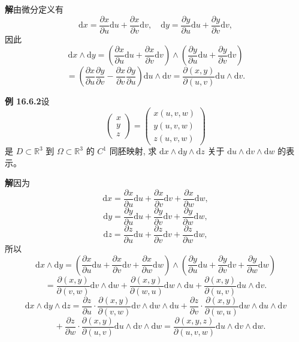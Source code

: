 \documentclass[UTF8,12pt,a4paper,fontset=fandol]{ctexart}
\begin{document}
\noindent\textbf{解}\quad 由微分定义有
\[
  \mathrm dx=\frac{\partial x}{\partial u}\mathrm du+\frac{\partial x}{\partial v}\mathrm dv,
  \quad
  \mathrm dy=\frac{\partial y}{\partial u}\mathrm du+\frac{\partial y}{\partial v}\mathrm dv,
\]
因此
\[
  \mathrm dx\wedge\mathrm dy
  =\left(\frac{\partial x}{\partial u}\mathrm du+\frac{\partial x}{\partial v}\mathrm dv\right)
  \wedge
  \left(\frac{\partial y}{\partial u}\mathrm du+\frac{\partial y}{\partial v}\mathrm dv\right)
\]
\[
  =\left(\frac{\partial x}{\partial u}\frac{\partial y}{\partial v}
  -\frac{\partial x}{\partial v}\frac{\partial y}{\partial u}\right)\mathrm du\wedge\mathrm dv
  =\frac{\partial(x,y)}{\partial(u,v)}\mathrm du\wedge\mathrm dv.
\]

\noindent\textbf{例 16.6.2}\quad 设
\[
  \begin{pmatrix}x\\y\\z\end{pmatrix}
  =
  \begin{pmatrix}x(u,v,w)\\y(u,v,w)\\z(u,v,w)\end{pmatrix}
\]
是 $D\subset\mathbb R^3$ 到 $\Omega\subset\mathbb R^3$ 的 $C^1$ 同胚映射, 求 $\mathrm dx\wedge\mathrm dy\wedge\mathrm dz$ 关于 $\mathrm du\wedge\mathrm dv\wedge\mathrm dw$ 的表示。

\noindent\textbf{解}\quad 因为
\[
  \mathrm dx=\frac{\partial x}{\partial u}\mathrm du+\frac{\partial x}{\partial v}\mathrm dv+\frac{\partial x}{\partial w}\mathrm dw,
\]
\[
  \mathrm dy=\frac{\partial y}{\partial u}\mathrm du+\frac{\partial y}{\partial v}\mathrm dv+\frac{\partial y}{\partial w}\mathrm dw,
\]
\[
  \mathrm dz=\frac{\partial z}{\partial u}\mathrm du+\frac{\partial z}{\partial v}\mathrm dv+\frac{\partial z}{\partial w}\mathrm dw,
\]
所以
\[
  \mathrm dx\wedge\mathrm dy
  =\left(\frac{\partial x}{\partial u}\mathrm du+\frac{\partial x}{\partial v}\mathrm dv+\frac{\partial x}{\partial w}\mathrm dw\right)
  \wedge
  \left(\frac{\partial y}{\partial u}\mathrm du+\frac{\partial y}{\partial v}\mathrm dv+\frac{\partial y}{\partial w}\mathrm dw\right)
\]
\[
  =\frac{\partial(x,y)}{\partial(v,w)}\mathrm dv\wedge\mathrm dw
  +\frac{\partial(x,y)}{\partial(w,u)}\mathrm dw\wedge\mathrm du
  +\frac{\partial(x,y)}{\partial(u,v)}\mathrm du\wedge\mathrm dv.
\]
\[
  \mathrm dx\wedge\mathrm dy\wedge\mathrm dz
  =\frac{\partial z}{\partial u}\cdot\frac{\partial(x,y)}{\partial(v,w)}
  \mathrm dv\wedge\mathrm dw\wedge\mathrm du
  +\frac{\partial z}{\partial v}\cdot\frac{\partial(x,y)}{\partial(w,u)}
  \mathrm dw\wedge\mathrm du\wedge\mathrm dv
\]
\[
  \quad+\frac{\partial z}{\partial w}\cdot\frac{\partial(x,y)}{\partial(u,v)}
  \mathrm du\wedge\mathrm dv\wedge\mathrm dw
  =\frac{\partial(x,y,z)}{\partial(u,v,w)}\mathrm du\wedge\mathrm dv\wedge\mathrm dw.
\]
\end{document}

